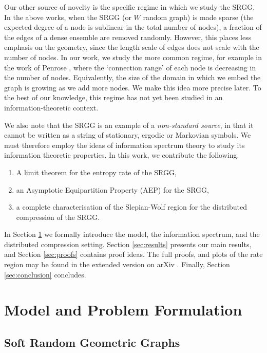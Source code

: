 \documentclass[conference,letterpaper]{IEEEtran}
\begin{document}
Our other source of novelty is the specific regime in which we study the SRGG. In the above works, when the SRGG (or $W$ random graph) is made sparse (the expected degree of a node is sublinear in the total number of nodes), a fraction of the edges of a dense ensemble are removed randomly. However, this places less emphasis on the geometry, since the length scale of edges does not scale with the number of nodes. In our work, we study the more common regime, for example in the work of Penrose \cite{penrose2016connectivity}, where the `connection range' of each node is decreasing in the number of nodes. Equivalently, the size of the domain in which we embed the graph is growing as we add more nodes. We make this idea more precise later. To the best of our knowledge, this regime has not yet been studied in an information-theoretic context.

We also note that the SRGG is an example of a \textit{non-standard source}, in that it cannot be written as a string of stationary, ergodic or Markovian symbols. We must therefore employ the ideas of information spectrum theory to study its information theoretic properties. In this work, we contribute the following. \begin{enumerate}
    \item A limit theorem for the entropy rate of the SRGG,
    \item an Asymptotic Equipartition Property (AEP) for the SRGG,
    \item a complete characterisation of the Slepian-Wolf region for the distributed compression of the SRGG.
\end{enumerate} In Section \ref{sec:prelims} we formally introduce the model, the information spectrum, and the distributed compression setting. Section \ref{sec:results} presents our main results, and Section \ref{sec:proofs} contains proof ideas. The full proofs, and plots of the rate region may be found in the extended version on arXiv \cite{baker2026entropydistributedsourcecoding}. Finally, Section \ref{sec:conclusion} concludes.

\section{Model and Problem Formulation}
\label{sec:prelims}

\subsection{Soft Random Geometric Graphs}
\end{document}
